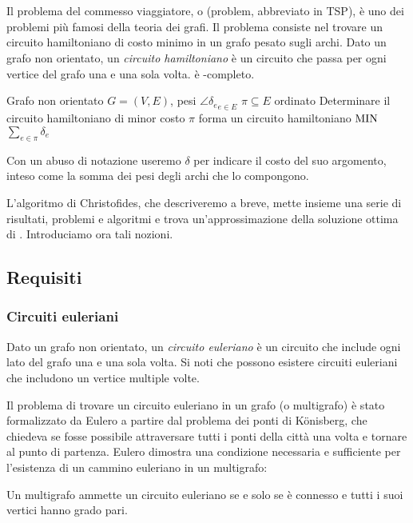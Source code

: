 \section{\TravelingSalesman}
Il problema del commesso viaggiatore, o \TravelingSalesman (problem, abbreviato in TSP), è uno dei problemi più famosi della teoria dei grafi.
Il problema consiste nel trovare un circuito hamiltoniano di costo minimo in un grafo pesato sugli archi.
Dato un grafo non orientato, un \emph{circuito hamiltoniano} è un circuito che passa per ogni vertice del grafo una e una sola volta.
\TravelingSalesman è \NPO-completo.

\popt{\TravelingSalesman}
{Grafo non orientato $G=(V,E)$, pesi $\angle{\delta_e}_{e\in E}$}
{$\pi\subseteq E$ ordinato}
{Determinare il circuito hamiltoniano di minor costo}
{$\pi$ forma un circuito hamiltoniano}
{$\mathrm{MIN}$}
{$\sum_{e\in\pi} \delta_e$}

Con un abuso di notazione useremo $\delta$ per indicare il costo del suo argomento, inteso come la somma dei pesi degli archi che lo compongono.

L'algoritmo di Christofides, che descriveremo a breve, mette insieme una serie di risultati, problemi e algoritmi e trova un'approssimazione della soluzione ottima di \TravelingSalesman. Introduciamo ora tali nozioni.


\subsection{Requisiti}

\subsubsection{Circuiti euleriani}
Dato un grafo non orientato, un \emph{circuito euleriano} è un circuito che include ogni lato del grafo una e una sola volta. Si noti che possono esistere circuiti euleriani che includono un vertice multiple volte.

Il problema di trovare un circuito euleriano in un grafo (o multigrafo) è stato formalizzato da Eulero a partire dal problema dei ponti di Könisberg, che chiedeva se fosse possibile attraversare tutti i ponti della città una volta e tornare al punto di partenza.
Eulero dimostra una condizione necessaria e sufficiente per l'esistenza di un cammino euleriano in un multigrafo:
\begin{theorem}[di Eulero]\label{thm:eulero}
	Un multigrafo ammette un circuito euleriano se e solo se è connesso e tutti i suoi vertici hanno grado pari.
\end{theorem}

